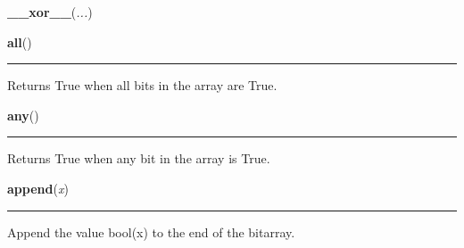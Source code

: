     \label{bitarray:_bitarray:__xor__}

    \vspace{0.5ex}

    \begin{boxedminipage}{\textwidth}

    \raggedright \textbf{\_\_xor\_\_}(\textit{...})

    \end{boxedminipage}

    \label{bitarray:_bitarray:all}

    \vspace{0.5ex}

    \begin{boxedminipage}{\textwidth}

    \raggedright \textbf{all}()

    \vspace{-1.5ex}

    \rule{\textwidth}{0.5\fboxrule}

Returns True when all bits in the array are True.
    \vspace{1ex}

    \end{boxedminipage}

    \label{bitarray:_bitarray:any}

    \vspace{0.5ex}

    \begin{boxedminipage}{\textwidth}

    \raggedright \textbf{any}()

    \vspace{-1.5ex}

    \rule{\textwidth}{0.5\fboxrule}

Returns True when any bit in the array is True.
    \vspace{1ex}

    \end{boxedminipage}

    \label{bitarray:_bitarray:append}

    \vspace{0.5ex}

    \begin{boxedminipage}{\textwidth}

    \raggedright \textbf{append}(\textit{x})

    \vspace{-1.5ex}

    \rule{\textwidth}{0.5\fboxrule}

Append the value bool(x) to the end of the bitarray.
    \vspace{1ex}

    \end{boxedminipage}

